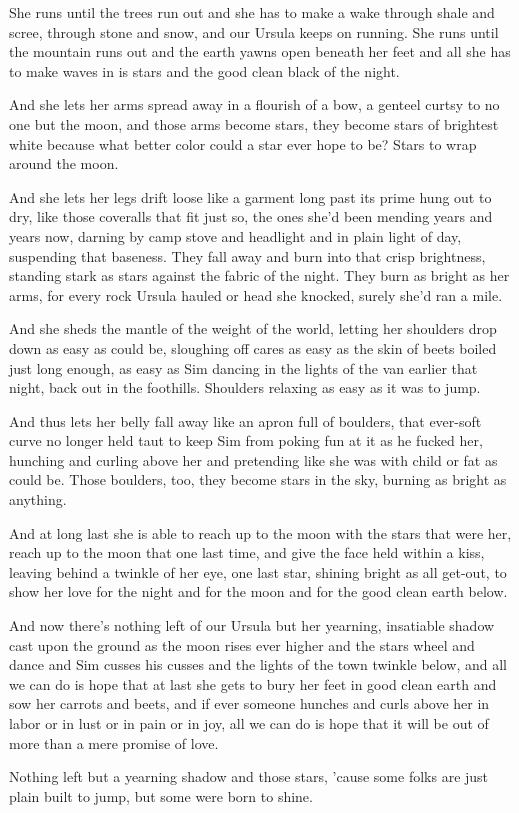 She runs until the trees run out and she has to make a wake through shale and scree, through stone and snow, and our Ursula keeps on running. She runs until the mountain runs out and the earth yawns open beneath her feet and all she has to make waves in is stars and the good clean black of the night.

And she lets her arms spread away in a flourish of a bow, a genteel curtsy to no one but the moon, and those arms become stars, they become stars of brightest white because what better color could a star ever hope to be? Stars to wrap around the moon.

And she lets her legs drift loose like a garment long past its prime hung out to dry, like those coveralls that fit just so, the ones she'd been mending years and years now, darning by camp stove and headlight and in plain light of day, suspending that baseness. They fall away and burn into that crisp brightness, standing stark as stars against the fabric of the night. They burn as bright as her arms, for every rock Ursula hauled or head she knocked, surely she'd ran a mile.

And she sheds the mantle of the weight of the world, letting her shoulders drop down as easy as could be, sloughing off cares as easy as the skin of beets boiled just long enough, as easy as Sim dancing in the lights of the van earlier that night, back out in the foothills. Shoulders relaxing as easy as it was to jump.

And thus lets her belly fall away like an apron full of boulders, that ever-soft curve no longer held taut to keep Sim from poking fun at it as he fucked her, hunching and curling above her and pretending like she was with child or fat as could be. Those boulders, too, they become stars in the sky, burning as bright as anything.

And at long last she is able to reach up to the moon with the stars that were her, reach up to the moon that one last time, and give the face held within a kiss, leaving behind a twinkle of her eye, one last star, shining bright as all get-out, to show her love for the night and for the moon and for the good clean earth below.

And now there's nothing left of our Ursula but her yearning, insatiable shadow cast upon the ground as the moon rises ever higher and the stars wheel and dance and Sim cusses his cusses and the lights of the town twinkle below, and all we can do is hope that at last she gets to bury her feet in good clean earth and sow her carrots and beets, and if ever someone hunches and curls above her in labor or in lust or in pain or in joy, all we can do is hope that it will be out of more than a mere promise of love.

Nothing left but a yearning shadow and those stars, 'cause some folks are just plain built to jump, but some were born to shine.

